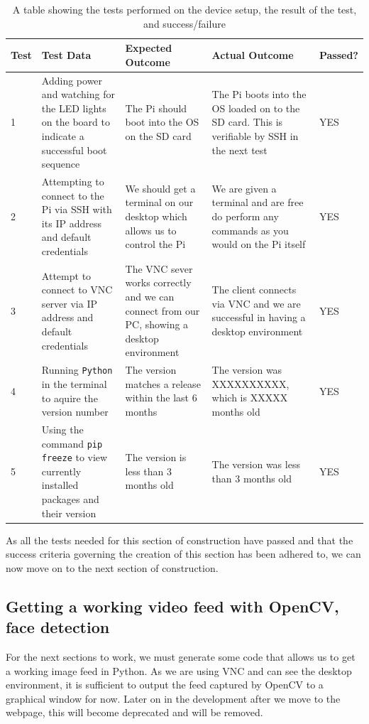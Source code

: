 \documentclass[9pt]{article}
\begin{document}
\begin{table}[H]
	\centering
	\begin{tabularx}{\textwidth}{lXXXl}
		\textbf{Test} & \textbf{Test Data}                                                                               & \textbf{Expected Outcome}                                                 & \textbf{Actual Outcome}                                                                       & \textbf{Passed?} \\ \midrule
		1             & Adding power and watching for the LED lights on the board to indicate a successful boot sequence & The Pi should boot into the OS on the SD card                             & The Pi boots into the OS loaded on to the SD card. This is verifiable by SSH in the next test & YES              \\
		2             & Attempting to connect to the Pi via SSH with its IP address and default credentials            & We should get a terminal on our desktop which allows us to control the Pi & We are given a terminal and are free do perform any commands as you would on the Pi itself    & YES              \\
		3             & Attempt to connect to VNC server via IP address and default credentials & The VNC sever works correctly and we can connect from our PC, showing a desktop environment
& The client connects via VNC and we are successful in having a desktop environment & YES \\
		4             & Running \texttt{Python} in the terminal to aquire the version number & The version matches a release within the last 6 months & The version was XXXXXXXXXX, which is XXXXX months old & YES \\
		5             & Using the command \texttt{pip freeze} to view currently installed packages and their version & The version is less than 3 months old & The version was less than 3 months old & YES \\ \bottomrule
	\end{tabularx}
	\caption{A table showing the tests performed on the device setup, the result of the test, and success/failure}
	\label{tab_deviceSetupTesting}
\end{table}
As all the tests needed for this section of construction have passed and that the success criteria governing the creation of this section has been adhered to, we can now move on to the next section of construction.
\newpage
\subsection{Getting a working video feed with OpenCV, face detection}\label{ssec_feed}
For the next sections to work, we must generate some code that allows us to get a working image feed in Python. As we are using VNC and can see the desktop environment, it is sufficient to output the feed captured by OpenCV to a graphical window for now. Later on in the development after we move to the webpage, this will become deprecated and will be removed.
\end{document}
